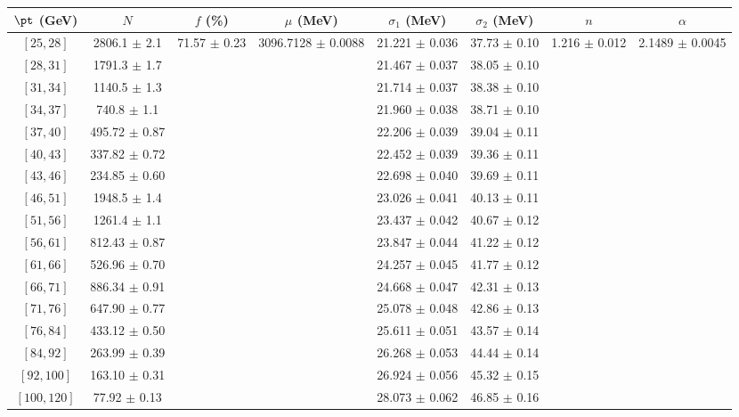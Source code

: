 \begin{tabular}{c||c|c|c|c|c|c|c}
$\pt$ (GeV) & $N$ & $f$ (\%) & $\mu$ (MeV) & $\sigma_1$ (MeV) & $\sigma_2$ (MeV) & $n$ & $\alpha$ \\
\hline
$[25, 28]$ & 2806.1 $\pm$ 2.1 & \multirow{17}{*}{71.57 $\pm$ 0.23} & \multirow{17}{*}{3096.7128 $\pm$ 0.0088} & 21.221 $\pm$ 0.036 & 37.73 $\pm$ 0.10 & \multirow{17}{*}{1.216 $\pm$ 0.012} & \multirow{17}{*}{2.1489 $\pm$ 0.0045}\\
$[28, 31]$ & 1791.3 $\pm$ 1.7 &  &  & 21.467 $\pm$ 0.037 & 38.05 $\pm$ 0.10 &  & \\
$[31, 34]$ & 1140.5 $\pm$ 1.3 &  &  & 21.714 $\pm$ 0.037 & 38.38 $\pm$ 0.10 &  & \\
$[34, 37]$ & 740.8 $\pm$ 1.1 &  &  & 21.960 $\pm$ 0.038 & 38.71 $\pm$ 0.10 &  & \\
$[37, 40]$ & 495.72 $\pm$ 0.87 &  &  & 22.206 $\pm$ 0.039 & 39.04 $\pm$ 0.11 &  & \\
$[40, 43]$ & 337.82 $\pm$ 0.72 &  &  & 22.452 $\pm$ 0.039 & 39.36 $\pm$ 0.11 &  & \\
$[43, 46]$ & 234.85 $\pm$ 0.60 &  &  & 22.698 $\pm$ 0.040 & 39.69 $\pm$ 0.11 &  & \\
$[46, 51]$ & 1948.5 $\pm$ 1.4 &  &  & 23.026 $\pm$ 0.041 & 40.13 $\pm$ 0.11 &  & \\
$[51, 56]$ & 1261.4 $\pm$ 1.1 &  &  & 23.437 $\pm$ 0.042 & 40.67 $\pm$ 0.12 &  & \\
$[56, 61]$ & 812.43 $\pm$ 0.87 &  &  & 23.847 $\pm$ 0.044 & 41.22 $\pm$ 0.12 &  & \\
$[61, 66]$ & 526.96 $\pm$ 0.70 &  &  & 24.257 $\pm$ 0.045 & 41.77 $\pm$ 0.12 &  & \\
$[66, 71]$ & 886.34 $\pm$ 0.91 &  &  & 24.668 $\pm$ 0.047 & 42.31 $\pm$ 0.13 &  & \\
$[71, 76]$ & 647.90 $\pm$ 0.77 &  &  & 25.078 $\pm$ 0.048 & 42.86 $\pm$ 0.13 &  & \\
$[76, 84]$ & 433.12 $\pm$ 0.50 &  &  & 25.611 $\pm$ 0.051 & 43.57 $\pm$ 0.14 &  & \\
$[84, 92]$ & 263.99 $\pm$ 0.39 &  &  & 26.268 $\pm$ 0.053 & 44.44 $\pm$ 0.14 &  & \\
$[92, 100]$ & 163.10 $\pm$ 0.31 &  &  & 26.924 $\pm$ 0.056 & 45.32 $\pm$ 0.15 &  & \\
$[100, 120]$ & 77.92 $\pm$ 0.13 &  &  & 28.073 $\pm$ 0.062 & 46.85 $\pm$ 0.16 &  & \\
\end{tabular}
